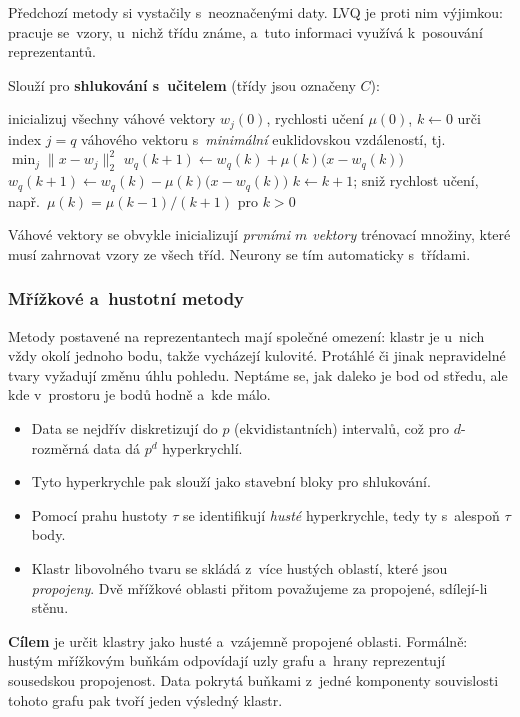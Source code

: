 \documentclass[11pt,a4paper]{article}
\theoremstyle{definition}
\begin{document}
Předchozí metody si vystačily s~neoznačenými daty. LVQ je proti nim výjimkou: pracuje
se~vzory, u~nichž třídu známe, a~tuto informaci využívá k~posouvání reprezentantů.

\begin{defbox}
Slouží pro \textbf{shlukování s~učitelem} (třídy jsou označeny $C$):
\begin{algorithmic}[1]
\State inicializuj všechny váhové vektory $w_j(0)$, rychlosti učení $\mu(0)$, $k\gets 0$
     \State urči index $j=q$ váhového vektoru s~\emph{minimální} euklidovskou vzdáleností,
            tj.\ $\min_j\|x-w_j\|_2^2$
        \State $w_q(k+1)\gets w_q(k)+\mu(k)\big(x-w_q(k)\big)$ 
     \Else
        \State $w_q(k+1)\gets w_q(k)-\mu(k)\big(x-w_q(k)\big)$ 
     \EndIf
  \EndFor
  \State $k\gets k+1$; sniž rychlost učení, např.\ $\mu(k)=\mu(k-1)/(k+1)$ pro $k>0$
\EndWhile
\end{algorithmic}
Váhové vektory se obvykle inicializují \emph{prvními $m$ vektory} trénovací množiny, které
musí zahrnovat vzory ze všech tříd. Neurony se tím automaticky  s~třídami.
\end{defbox}

\subsubsection{Mřížkové a~hustotní metody}

Metody postavené na reprezentantech mají společné omezení: klastr je u~nich vždy okolí
jednoho bodu, takže vycházejí kulovité. Protáhlé či jinak nepravidelné tvary vyžadují změnu
úhlu pohledu. Neptáme se, jak daleko je bod od středu, ale kde v~prostoru je bodů hodně
a~kde málo.

\begin{defbox}
\begin{itemize}
\item Data se nejdřív diskretizují do $p$ (ekvidistantních) intervalů, což pro $d$-rozměrná
      data dá $p^d$ hyperkrychlí.
\item Tyto hyperkrychle pak slouží jako stavební bloky pro shlukování.
\item Pomocí prahu hustoty $\tau$ se identifikují \emph{husté} hyperkrychle, tedy ty
      s~alespoň $\tau$ body.
\item Klastr libovolného tvaru se skládá z~více hustých oblastí, které jsou \emph{propojeny}.
      Dvě mřížkové oblasti přitom považujeme za propojené, sdílejí-li stěnu.
\end{itemize}
\textbf{Cílem} je určit klastry jako husté a~vzájemně propojené oblasti. Formálně: hustým
mřížkovým buňkám odpovídají uzly grafu a~hrany reprezentují sousedskou propojenost. Data
pokrytá buňkami z~jedné komponenty souvislosti tohoto grafu pak tvoří jeden výsledný klastr.
\end{defbox}
\end{document}
